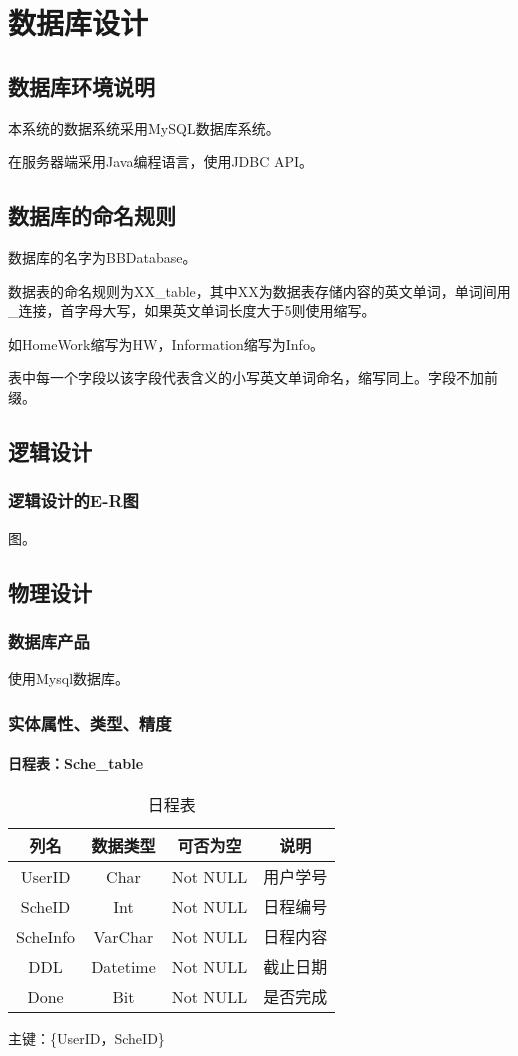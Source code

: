 \chapter{数据库设计}
\section{数据库环境说明}
本系统的数据系统采用MySQL数据库系统。

在服务器端采用Java编程语言，使用JDBC API。

\section{数据库的命名规则}
数据库的名字为BBDatabase。

数据表的命名规则为XX\_table，其中XX为数据表存储内容的英文单词，单词间用\_连接，首字母大写，如果英文单词长度大于5则使用缩写。

如HomeWork缩写为HW，Information缩写为Info。

表中每一个字段以该字段代表含义的小写英文单词命名，缩写同上。字段不加前缀。

\section{逻辑设计}
\subsection{逻辑设计的E-R图}
图。

\section{物理设计}
\subsection{数据库产品}
使用Mysql数据库。

\subsection{实体属性、类型、精度}
\subsubsection{日程表：Sche\_table}

\begin{table}[htbp]
\centering
\caption{日程表} \label{tab:classification}
\begin{tabular}{|c|c|c|c|}
    \hline
    列名 & 数据类型 & 可否为空 & 说明 \\
    \hline
    UserID & Char & Not NULL & 用户学号 \\
    \hline
    ScheID & Int & Not NULL & 日程编号 \\
    \hline
    ScheInfo & VarChar & Not NULL & 日程内容 \\
    \hline
    DDL & Datetime & Not NULL & 截止日期 \\
    \hline
    Done & Bit & Not NULL & 是否完成 \\
    \hline
\end{tabular}
\end{table}
主键：\{UserID，ScheID\}


